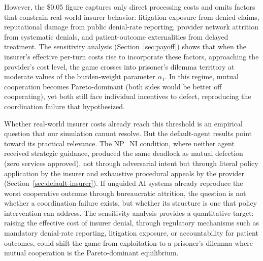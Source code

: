 However, the \$0.05 figure captures only direct processing costs and omits factors that constrain real-world insurer behavior: litigation exposure from denied claims, reputational damage from public denial-rate reporting, provider network attrition from systematic denials, and patient-outcome externalities from delayed treatment. The sensitivity analysis (Section~\ref{sec:payoff}) shows that when the insurer's effective per-turn costs rise to incorporate these factors, approaching the provider's cost level, the game crosses into prisoner's dilemma territory at moderate values of the burden-weight parameter $\alpha_I$. In this regime, mutual cooperation becomes Pareto-dominant (both sides would be better off cooperating), yet both still face individual incentives to defect, reproducing the coordination failure that \citet{moritz2025lancet} hypothesized.

Whether real-world insurer costs already reach this threshold is an empirical question that our simulation cannot resolve. But the default-agent results point toward its practical relevance. The NP\_NI condition, where neither agent received strategic guidance, produced the same deadlock as mutual defection (zero services approved), not through adversarial intent but through literal policy application by the insurer and exhaustive procedural appeals by the provider (Section~\ref{sec:default-insurer}). If unguided AI systems already reproduce the worst cooperative outcome through bureaucratic attrition, the question is not whether a coordination failure exists, but whether its structure is one that policy intervention can address. The sensitivity analysis provides a quantitative target: raising the effective cost of insurer denial, through regulatory mechanisms such as mandatory denial-rate reporting, litigation exposure, or accountability for patient outcomes, could shift the game from exploitation to a prisoner's dilemma where mutual cooperation is the Pareto-dominant equilibrium.

